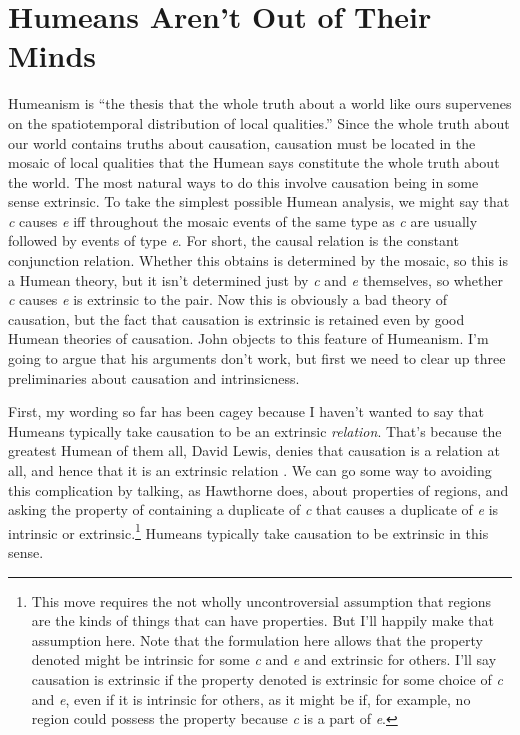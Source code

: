 
%
%
%
%
%
%
%
%
%
%
\chapter{Humeans Aren't Out of Their Minds}


Humeanism is ``the thesis that the whole truth about a world like ours supervenes on the spatiotemporal distribution of local qualities.'' \cite[473]{Lewis1994a} Since the whole truth about our world contains truths about causation, causation must be located in the mosaic of local qualities that the Humean says constitute the whole truth about the world. The most natural ways to do this involve causation being in some sense extrinsic. To take the simplest possible Humean analysis, we might say that \textit{c} causes \textit{e} iff throughout the mosaic events of the same type as \textit{c} are usually followed by events of type \textit{e}. For short, the causal relation is the constant conjunction relation. Whether this obtains is determined by the mosaic, so this is a Humean theory, but it isn't determined just by \textit{c} and \textit{e} themselves, so whether \textit{c} causes \textit{e} is extrinsic to the pair. Now this is obviously a bad theory of causation, but the fact that causation is extrinsic is retained even by good Humean theories of causation. John \citet{Hawthorne2004-Humeans} objects to this feature of Humeanism. I'm going to argue that his arguments don't work, but first we need to clear up three preliminaries about causation and intrinsicness.

First, my wording so far has been cagey because I haven't wanted to say that Humeans typically take causation to be an extrinsic \textit{relation}. That's because the greatest Humean of them all, David Lewis, denies that causation is a relation at all, and hence that it is an extrinsic relation \citep{Lewis2004d}. We can go some way to avoiding this complication by talking, as Hawthorne does, about properties of regions, and asking the property of containing a duplicate of \textit{c} that causes a duplicate of \textit{e} is intrinsic or extrinsic.\footnote{This move requires the not wholly uncontroversial assumption that regions are the kinds of things that can have properties. But I'll happily make that assumption here. Note that the formulation here allows that the property denoted might be intrinsic for some \textit{c} and \textit{e} and extrinsic for others. I'll say causation is extrinsic if the property denoted is extrinsic for some choice of \textit{c} and \textit{e}, even if it is intrinsic for others, as it might be if, for example, no region could possess the property because \textit{c} is a part of \textit{e}. } Humeans typically take causation to be extrinsic in this sense.

